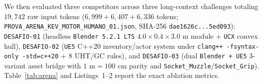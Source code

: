 \documentclass[10pt,a4paper]{article}
\begin{document}
We then evaluated three competitors across three long-context challenges totaling $19,742$ raw input tokens ($6,999 + 6,407 + 6,336$ tokens; \texttt{PROVA\_\allowbreak{}ARENA\_\allowbreak{}KEV\_\allowbreak{}MOTOR\_\allowbreak{}HUMANO\_\allowbreak{}01.json}, SHA-256 \texttt{dae1626c...5ed093}): \texttt{DESAFIO-01} (headless \texttt{Blender 5.2.1 LTS} $4.0\times 0.4\times 3.0\text{ m}$ module + \texttt{UCX} convex hull), \texttt{DESAFIO-02} (\texttt{UE5} C++20 inventory/actor system under \texttt{clang++ -fsyntax-only -std=c++20} + $8$ UHT/GC rules), and \texttt{DESAFIO-03} (dual \texttt{Blender + UE5} 3-variant asset bridge with $1\text{ m} = 100\text{ cm}$ parity and \texttt{Socket\_\allowbreak{}Muzzle}/\texttt{Socket\_\allowbreak{}Grip}). Table~\ref{tab:arena} and Listings~1--2 report the exact ablation metrics.
\end{document}
